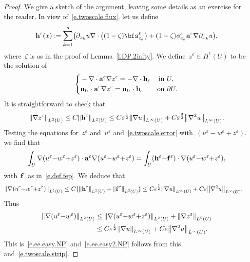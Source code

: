 \documentclass[11pt,twoside]{article} %
\numberwithin{equation}{section}
\theoremstyle{definition}
\let\originalleft\left
\let\originalright\right
\renewcommand{\left}{\mathopen{}\mathclose\bgroup\originalleft}
\renewcommand{\right}{\aftergroup\egroup\originalright}
\newcommand{\eps}{\varepsilon}
\newcommand{\f}{\mathbf{f}}
\newcommand{\ep}{\eps}
\renewcommand{\a}{\mathbf{a}}
\begin{document}
\begin{proof}
We give a sketch of the argument, leaving some details as an exercise for the reader.
In view of~\eqref{e.twoscale.flux}, let us define 
\begin{equation}
\mathbf{h}^\ep (x)
:= 
\sum_{k=1}^d 
\left( 
\partial_{x_k} u  \nabla \cdot \left( (1-\zeta) \bfs^\ep_{e_k} \right)
+
 (1-\zeta)\phi^\ep_{e_k} \a^\ep \nabla \partial_{x_k} u 
\right),
\end{equation}
where~$\zeta$ is as in the proof of Lemma~\ref{l.DP.2infty}. 
We define~$z^\ep\in H^1(U)$ to be the solution of 
\begin{align*}
\left\{
\begin{aligned}
& -\nabla \cdot \a^\ep \nabla z^\ep = - \nabla \cdot \mathbf{h}_\ep
& \mbox{in} & \ U,  \\
& \mathbf{n}_{U} \cdot \a^\ep \nabla z^\ep = \mathbf{n}_{U} \cdot \mathbf{h}_\ep 
& \mbox{on} & \ \partial U. 
\end{aligned}
\right. 
\end{align*}
It is straightforward to check that 
\begin{equation}
\left\| \nabla z^\ep \right\|_{L^2(U)}
\leq 
C\left\| \mathbf{h}^\ep \right\|_{L^2(U)}
\leq
C \ep^{\frac12} \left\| \nabla u \right\|_{L^\infty(U)}
+
C \ep^{\frac32} \left\| \nabla^2 u \right\|_{L^\infty(U)}.
\end{equation}
Testing the equations for~$z^\ep$ and~$u^\ep$ and~\eqref{e.twoscale.error} with~$(u^\ep {-} w^\ep {+} z^\ep)$. we find that 
\begin{equation}
\int_U 
\nabla (u^\ep {-} w^\ep {+} z^\ep) 
\cdot \a^\ep 
\nabla (u^\ep {-} w^\ep {+} z^\ep)
=
\int_U 
\left(\mathbf{h}^\ep {-} \f^\ep \right)
\cdot
\nabla (u^\ep {-} w^\ep {+} z^\ep),
\end{equation}
with~$\f^\ep$ as in~\eqref{e.def.fep}. We deduce that 
\begin{align*}
\left\| 
\nabla (u^\ep {-} w^\ep {+} z^\ep)
\right\|_{L^2(U)}
& 
\leq 
C \bigl( 
\left\| \mathbf{h}^\ep \right\|_{L^2(U)}
+\left\| \f^\ep \right\|_{L^2(U)}
\bigr)
\leq
C \ep^{\frac12} \left\| \nabla u \right\|_{L^\infty(U)}
+
C \ep \left\| \nabla^2 u \right\|_{L^\infty(U)}.
\end{align*}
Thus 
\begin{align*}
\left\| 
\nabla (u^\ep {-} w^\ep)
\right\|_{L^2(U)}
&
\leq
\left\| 
\nabla (u^\ep {-} w^\ep {+} z^\ep)
\right\|_{L^2(U)}
+
\left\| 
\nabla z^\ep
\right\|_{L^2(U)}
\notag \\ &
\leq 
C \ep^{\frac12} \left\| \nabla u \right\|_{L^\infty(U)}
+
C \ep \left\| \nabla^2 u \right\|_{L^\infty(U)}.
\end{align*}
This is~\eqref{e.ee.easy.NP} and~\eqref{e.ee.easy2.NP} follows from this and~\eqref{e.twoscale.strip}. 
\end{proof}
\end{document}
